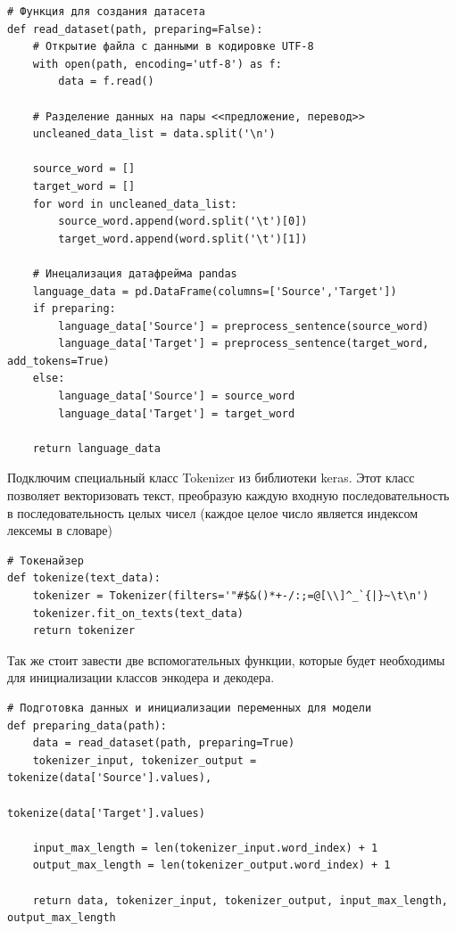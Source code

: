 	\begin{lstlisting}[language=iPython]
# Функция для создания датасета
def read_dataset(path, preparing=False):
    # Открытие файла с данными в кодировке UTF-8
    with open(path, encoding='utf-8') as f:
        data = f.read()
    
    # Разделение данных на пары <<предложение, перевод>>
    uncleaned_data_list = data.split('\n')
    
    source_word = []
    target_word = []
    for word in uncleaned_data_list:
        source_word.append(word.split('\t')[0])
        target_word.append(word.split('\t')[1])
    
    # Инецализация датафрейма pandas
    language_data = pd.DataFrame(columns=['Source','Target'])
    if preparing:
        language_data['Source'] = preprocess_sentence(source_word)
        language_data['Target'] = preprocess_sentence(target_word, add_tokens=True)
    else:
        language_data['Source'] = source_word
        language_data['Target'] = target_word
        
    return language_data \end{lstlisting}
	
	Подключим специальный класс Tokenizer из библиотеки keras. Этот класс позволяет векторизовать текст, преобразую каждую входную последовательность в последовательность целых чисел (каждое целое число является индексом лексемы в словаре)
	
	\begin{lstlisting}[language=iPython]
# Токенайзер
def tokenize(text_data):
    tokenizer = Tokenizer(filters='"#$&()*+-/:;=@[\\]^_`{|}~\t\n')
    tokenizer.fit_on_texts(text_data)
    return tokenizer \end{lstlisting}

    Так же стоит завести две вспомогательных функции, которые будет необходимы для инициализации классов энкодера и декодера.
    
	\begin{lstlisting}[language=iPython]
# Подготовка данных и инициализации переменных для модели
def preparing_data(path):
    data = read_dataset(path, preparing=True)
    tokenizer_input, tokenizer_output = tokenize(data['Source'].values),
                                                tokenize(data['Target'].values)
                                                
    input_max_length = len(tokenizer_input.word_index) + 1
    output_max_length = len(tokenizer_output.word_index) + 1
    
    return data, tokenizer_input, tokenizer_output, input_max_length, output_max_length \end{lstlisting}
    
